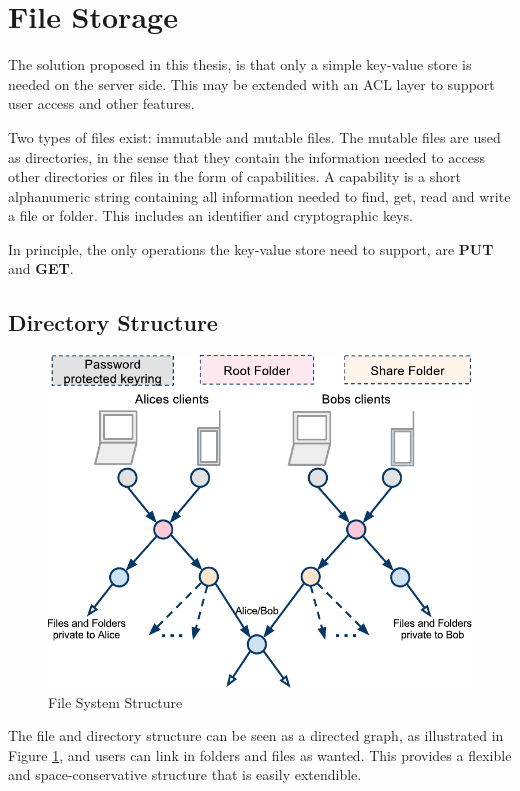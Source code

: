 \documentclass[pdftex,english,10pt,b5paper,twoside]{book}
\begin{document}
\section{File Storage}
\label{sec:AS:FS}

The solution proposed in this thesis, is that only a simple key-value store is
needed on the server side. This may be extended with an \ac{ACL} layer to
support user access and other features.

Two types of files exist: immutable and mutable files. The mutable files are used
as directories, in the sense that they contain the information needed to access
other directories or files in the form of capabilities.
A capability is a short alphanumeric string containing all information needed
to find, get, read and write a file or folder. This includes an identifier and
cryptographic keys.

In principle, the only operations the key-value store need to support, are
\textbf{PUT} and \textbf{GET}.

\subsection{Directory Structure}

\begin{figure}[h!]
    \centering
    \includegraphics[width=\columnwidth]{ArchitectureFileSystem.pdf}
    \caption{File System Structure}
    \label{fig:AS:filesystem}
\end{figure}

The file and directory structure can be seen as a directed graph, as illustrated
in Figure \ref{fig:AS:filesystem}, and users can link in folders and files as
wanted. This provides a flexible and space-conservative structure that is easily
extendible.
\end{document}
